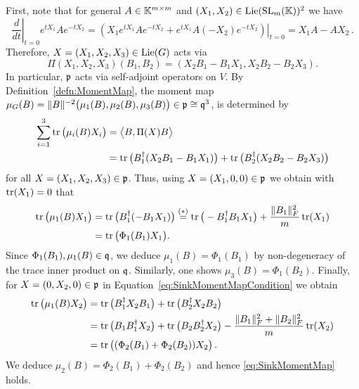 \begin{example}
	First, note that for general $A \in \mathbb K^{m \times m}$ and $(X_1,X_2) \in \operatorname{Lie}(\operatorname{SL}_m(\mathbb K))^2$ we have
	 \[ \left. \frac{d}{dt} \right|_{t=0} e^{tX_1} A e^{-tX_2}
	 = \left. \left( X_1 e^{t X_1} A e^{-t X_2} + e^{t X_1} A (-X_2) e^{-t X_2} \right)\right|_{t=0} 
	 = X_1 A - A X_2 \, .\]
	 Therefore, $X = (X_1,X_2,X_3) \in \operatorname{Lie}(G)$ acts via
	 	\[ \Pi(X_1,X_2,X_3)(B_1,B_2) = ( X_2 B_1 - B_1 X_1, X_2 B_2 - B_2 X_3 ) . \]
	 In particular, $\mathfrak{p}$ acts via self-adjoint operators on $V$. 
	 By Definition~\ref{defn:MomentMap}, the moment map $\mu_G(B) = \|B\|^{-2} \big( \mu_1(B), \mu_2(B), \mu_3(B) \big) \in \mathfrak{p} \cong \mathfrak{q}^3$, is determined by 
	 \begin{equation}\label{eq:SinkMomentMapCondition}
	 	\begin{split}			
	 		\sum_{i=1}^3 \operatorname{tr} \big( \mu_i(B) X_i \big) &= \big\langle B, \Pi(X) B \big\rangle
	 		\\	&= \operatorname{tr} \big( B_1^{\dagger} (X_2 B_1 - B_1 X_1)  \big) + \operatorname{tr}\big( B_2^{\dagger} (X_2 B_2 - B_2 X_3 ) \big)
	 	\end{split}
	 \end{equation}
	 for all $X = (X_1,X_2,X_3) \in \mathfrak{p}$.
	 Thus, using $X = (X_1,0,0) \in \mathfrak{p}$ we obtain with $\operatorname{tr}(X_1)=0$ that
	 \begin{align*}
	 	\operatorname{tr} \big( \mu_1(B) X_1 \big)& = \operatorname{tr} \big( B^{\dagger}_1 (-B_1 X_1) \big) 
	 	\overset{(*)}{=}  \operatorname{tr} \big( - B^{\dagger}_1 B_1 X_1  \big) + \frac{\|B_1\|_F^2}{m} \operatorname{tr}( X_1 ) \\
	 	&= \operatorname{tr} \big( \Phi_1(B_1) X_1 \big) .
	 \end{align*}
	 Since $\Phi_1(B_1) , \mu_1(B) \in \mathfrak{q}$, we deduce $\mu_1(B) = \Phi_1(B_1)$ by non-degeneracy of the trace inner product on $\mathfrak{q}$. Similarly, one shows $\mu_3(B) = \Phi_1(B_2)$. 
	 Finally, for $X = (0, X_2, 0) \in \mathfrak{p}$ in Equation~\eqref{eq:SinkMomentMapCondition} we obtain
	 	\begin{align*}
	 		\operatorname{tr} \big( \mu_1(B) X_2 \big) &= \operatorname{tr} \big( B_1^{\dagger} X_2 B_1 \big) + \operatorname{tr} \big( B_2^{\dagger} X_2 B_2 \big) \\
	 		&=  \operatorname{tr} \big( B_1 B_1^{\dagger} X_2 \big) + \operatorname{tr} \big( B_2 B_2^{\dagger} X_2 \big) - \frac{\|B_1\|^2_F + \|B_2\|^2_F}{m} \operatorname{tr}(X_2) \\
	 		&= \operatorname{tr} \big( (\Phi_2(B_1) + \Phi_2(B_2)) X_2 \big) \, .
	 	\end{align*}
	 We deduce $\mu_2(B) = \Phi_2(B_1) + \Phi_2(B_2)$ and hence \eqref{eq:SinkMomentMap} holds.
	 

\end{example}
